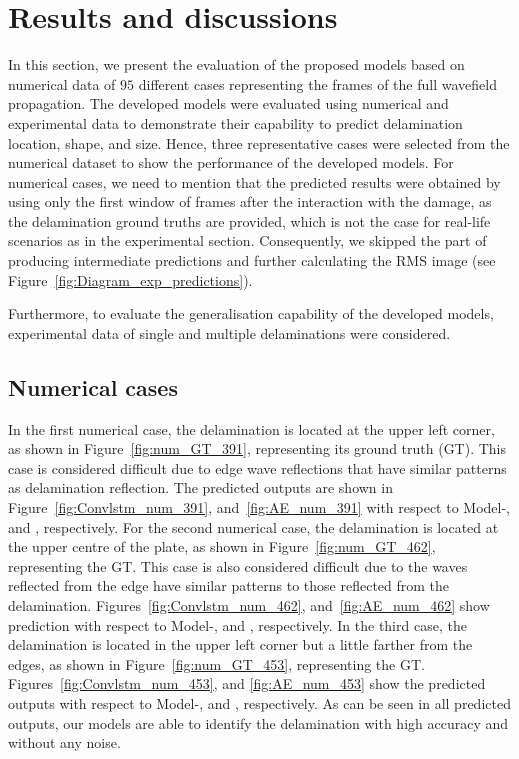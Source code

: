 \section{Results and discussions}
In this section, we present the evaluation of the proposed models based on numerical data of \(95\) different cases representing the frames of the full wavefield propagation. 
The developed models were evaluated using numerical and experimental data to demonstrate their capability to predict delamination location, shape, and size.
Hence, three representative cases were selected from the numerical dataset to show the performance of the developed models.
For numerical cases, we need to mention that the predicted results were obtained by using only the first window of frames after the interaction with the damage, as the delamination ground truths are provided, which is not the case for real-life scenarios as in the experimental section. 
Consequently, we skipped the part of producing intermediate predictions and 
further calculating the RMS image (see 
Figure~\ref{fig:Diagram_exp_predictions}).

Furthermore, to evaluate the generalisation capability of the developed models, experimental data of single and multiple delaminations were considered.
 
\subsection{Numerical cases}
In the first numerical case, the delamination is located at the upper left 
corner, as shown in Figure~\ref{fig:num_GT_391}, representing its ground truth 
(GT).
This case is considered difficult due to edge wave reflections that have similar patterns as delamination reflection.
The predicted outputs are shown in Figure~\ref{fig:Convlstm_num_391}, 
and~\ref{fig:AE_num_391} with respect to Model-, and , 
respectively.
For the second numerical case, the delamination is located at the upper centre 
of the plate, as shown in Figure~\ref{fig:num_GT_462}, representing the GT.
This case is also considered difficult due to the waves reflected from the edge have similar patterns to those reflected from the delamination.
Figures~\ref{fig:Convlstm_num_462}, and~\ref{fig:AE_num_462} show prediction with respect to Model-, and , respectively.
In the third case, the delamination is located in the upper left corner but a 
little farther from the edges, as shown in Figure~\ref{fig:num_GT_453}, 
representing the GT. 
Figures~\ref{fig:Convlstm_num_453}, and \ref{fig:AE_num_453} show the predicted outputs with respect to Model-, and , respectively.
As can be seen in all predicted outputs, our models are able to identify the delamination with high accuracy and without any noise.

